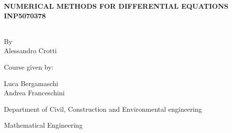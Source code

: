\documentclass[12pt]{report}
\author{Javad Ibrahimli}
\numberwithin{figure}{chapter}
\begin{document}

\begin{titlepage}
{\color{purple}
\begin{center}
    
    \vspace*{-2.5cm}
    
    \vspace{2.3cm}
    

    \vspace{1cm}
    {\textbf{NUMERICAL METHODS FOR DIFFERENTIAL EQUATIONS \\}}
    \vspace{0.3cm}
    {\textbf{INP5070378\\}}
    \vspace{2.4cm}
    
    {}\\
    By\\
    Alessandro Crotti \\ 
    \vspace{0.9cm}
    {\begin{singlespace}Course given by:\\\end{singlespace}}
    {\begin{singlespace}Luca Bergamaschi\\
    Andrea Franceschini\\\end{singlespace}}


\end{center}
{\raggedleft\vfill{\begin{singlespace}
     Department of Civil, Construction and Environmental engineering\\
\end{singlespace}
 Mathematical Engineering\\
 \begin{singlespace}

 
 \end{singlespace} 
 
}\par
}
}
\end{titlepage}
\end{document}
